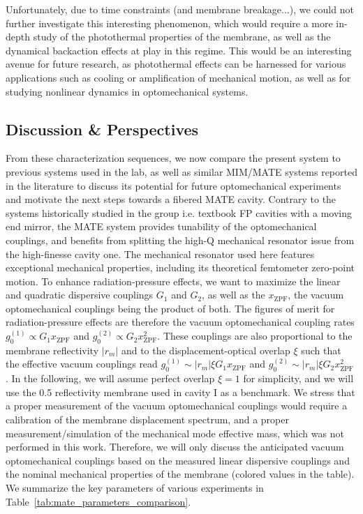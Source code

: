 Unfortunately, due to time constraints (and membrane breakage...), we could not further investigate this interesting phenomenon, which would require a more in-depth study of the photothermal properties of the membrane, as well as the dynamical backaction effects at play in this regime. This would be an interesting avenue for future research, as photothermal effects can be harnessed for various applications such as cooling or amplification of mechanical motion, as well as for studying nonlinear dynamics in optomechanical systems. 


\subsection{Discussion \& Perspectives}
From these characterization sequences, we now compare the present system to previous systems used in the lab, as well as similar MIM/MATE systems reported in the literature to discuss its potential for future optomechanical experiments and motivate the next steps towards a fibered MATE cavity. Contrary to the systems historically studied in the group i.e. textbook FP cavities with a moving end mirror, the MATE system provides tunability of the optomechanical couplings, and benefits from splitting the high-Q mechanical resonator issue from the high-finesse cavity one. The mechanical resonator used here features exceptional mechanical properties, including its theoretical femtometer zero-point motion. To enhance radiation-pressure effects, we want to maximize the linear and quadratic dispersive couplings $G_1$ and $G_2$, as well as the $x_{\text{ZPF}}$, the vacuum optomechanical couplings being the product of both. The figures of merit for radiation-pressure effects are therefore the vacuum optomechanical coupling rates $g_0^{(1)} \propto G_1 x_{\text{ZPF}}$ and $g_0^{(2)} \propto G_2 x_{\text{ZPF}}^2$. These couplings are also proportional to the membrane reflectivity $|r_m|$ and to the displacement-optical overlap $\xi$ such that the effective vacuum couplings read $g_0^{(1)} \sim |r_m| \xi G_1 x_{\text{ZPF}}$ and $g_0^{(2)} \sim |r_m| \xi G_2 x_{\text{ZPF}}^2$ \cite{enzian_phononically_2023,Groblacher_2016}. In the following, we will assume perfect overlap $\xi = 1$ for simplicity, and we will use the 0.5 reflectivity membrane used in cavity I as a benchmark. We stress that a proper measurement of the vacuum optomechanical couplings would require a calibration of the membrane displacement spectrum, and a proper measurement/simulation of the mechanical mode effective mass, which was not performed in this work. Therefore, we will only discuss the anticipated vacuum optomechanical couplings based on the measured linear dispersive couplings and the nominal mechanical properties of the membrane (colored values in the table). We summarize the key parameters of various experiments in Table~\ref{tab:mate_parameters_comparison}. \\ 


